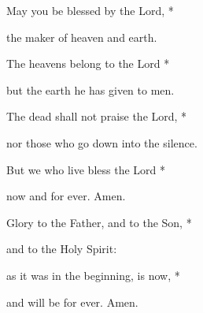 May you be blessed by the Lord, *

the maker of heaven and earth.

The heavens belong to the Lord *

but the earth he has given to men.



The dead shall not praise the Lord, *

nor those who go down into the silence.

But we who live bless the Lord *

now and for ever. Amen.



Glory to the Father, and to the Son, *

and to the Holy Spirit:

as it was in the beginning, is now, *

and will be for ever. Amen.